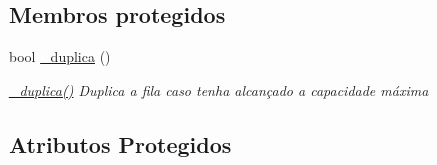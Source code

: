 \subsection*{Membros protegidos}
\begin{DoxyCompactItemize}
\item 
bool \hyperlink{class_fila_a2b9eb625b7d2b80cf497811ae9e116e9}{\-\_\-duplica} ()
\begin{DoxyCompactList}\small\item\em \hyperlink{class_fila_a2b9eb625b7d2b80cf497811ae9e116e9}{\-\_\-duplica()} Duplica a fila caso tenha alcançado a capacidade máxima \end{DoxyCompactList}\end{DoxyCompactItemize}
\subsection*{Atributos Protegidos}
